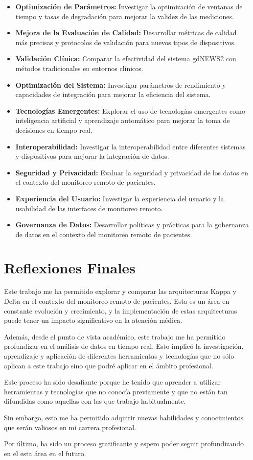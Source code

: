 \begin{itemize}
    \item \textbf{Optimización de Parámetros:} Investigar la optimización de ventanas de tiempo y tasas de degradación para mejorar la validez de las mediciones.
    \item \textbf{Mejora de la Evaluación de Calidad:} Desarrollar métricas de calidad más precisas y protocolos de validación para nuevos tipos de dispositivos.
    \item \textbf{Validación Clínica:} Comparar la efectividad del sistema gdNEWS2 con métodos tradicionales en entornos clínicos.
    \item \textbf{Optimización del Sistema:} Investigar parámetros de rendimiento y capacidades de integración para mejorar la eficiencia del sistema.
    \item \textbf{Tecnologías Emergentes:} Explorar el uso de tecnologías emergentes como inteligencia artificial y aprendizaje automático para mejorar la toma de decisiones en tiempo real.
    \item \textbf{Interoperabilidad:} Investigar la interoperabilidad entre diferentes sistemas y dispositivos para mejorar la integración de datos.
    \item \textbf{Seguridad y Privacidad:} Evaluar la seguridad y privacidad de los datos en el contexto del monitoreo remoto de pacientes.
    \item \textbf{Experiencia del Usuario:} Investigar la experiencia del usuario y la usabilidad de las interfaces de monitoreo remoto.
    \item \textbf{Governanza de Datos:} Desarrollar políticas y prácticas para la gobernanza de datos en el contexto del monitoreo remoto de pacientes.
\end{itemize}
\newpage
\section{Reflexiones Finales}

Este trabajo me ha permitido explorar y comparar las arquitecturas Kappa y Delta en el contexto del monitoreo remoto de pacientes.
Esta es un área en constante evolución y crecimiento, y la implementación de estas arquitecturas puede tener un impacto significativo en la atención médica.

Además, desde el punto de vista académico, este trabajo me ha permitido profundizar en el análisis de datos en tiempo real.
Esto implicó la investigación, aprendizaje y aplicación de diferentes herramientas y tecnologías que no sólo aplican 
a este trabajo sino que podré aplicar en el ámbito profesional.

Este proceso ha sido desafiante porque he tenido que aprender a utilizar herramientas y tecnologías que no conocía previamente 
y que no están tan difundidas como aquellas con las que trabajo habitualmente.

Sin embargo, esto me ha permitido adquirir nuevas habilidades y conocimientos que serán valiosos en mi carrera profesional.

Por último, ha sido un proceso gratificante y espero poder seguir profundizando en el esta área en el futuro.